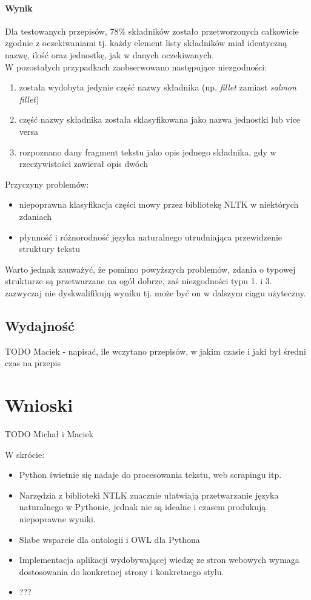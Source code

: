 \documentclass[11pt,a4paper]{article}
\begin{document}
\paragraph{Wynik} 
Dla testowanych przepisów, 78\% składników zostało przetworzonych całkowicie zgodnie z oczekiwaniami tj. każdy element listy składników miał identyczną nazwę, ilość oraz jednostkę, jak w danych oczekiwanych.\\
W pozostałych przypadkach zaobserwowano następujące niezgodności:
\begin{enumerate}
\item została wydobyta jedynie część nazwy składnika (np. \textit{fillet} zamiast \textit{salmon fillet})
\item część nazwy składnika została sklasyfikowana jako nazwa jednostki lub vice versa
\item rozpoznano dany fragment tekstu jako opis jednego składnika, gdy w rzeczywistości zawierał opis dwóch
\end{enumerate}
Przyczyny problemów:
\begin{itemize}
\item niepoprawna klasyfikacja części mowy przez bibliotekę NLTK w niektórych zdaniach
\item płynność i różnorodność języka naturalnego utrudniająca przewidzenie struktury tekstu
\end{itemize}
Warto jednak zauważyć, że pomimo powyższych problemów, zdania o typowej strukturze są przetwarzane na ogół dobrze, zaś niezgodności typu 1. i 3. zazwyczaj nie dyskwalifikują wyniku tj. może być on w dalszym ciągu użyteczny.
\subsection{Wydajność}
TODO Maciek - napisać, ile wczytano przepisów, w jakim czasie i jaki był średni czas na przepis

\section{Wnioski}
TODO Michał i Maciek

W skrócie: %
\begin{itemize}
  \item Python świetnie się nadaje do procesowania tekstu, web scrapingu itp.
  \item Narzędzia z biblioteki NTLK znacznie ułatwiają przetwarzanie języka naturalnego w Pythonie, jednak nie są idealne i czasem produkują niepoprawne wyniki.
  \item Słabe wsparcie dla ontologii i OWL dla Pythona
  \item Implementacja aplikacji wydobywającej wiedzę ze stron webowych wymaga dostosowania do konkretnej strony i konkretnego stylu.
  \item ???
\end{itemize}
\end{document}
